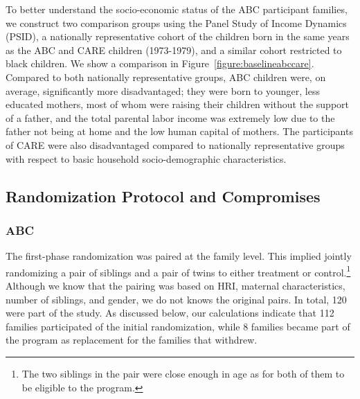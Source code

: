 \noindent To better understand the socio-economic status of the ABC participant families, we construct two comparison groups using the Panel Study of Income Dynamics (PSID), a nationally representative cohort of the children born in the same years as the ABC and CARE children (1973-1979), and a similar cohort restricted to black children. We show a comparison in Figure~\ref{figure:baselineabccare}. Compared to both nationally representative groups, ABC children were, on average, significantly more disadvantaged; they were born to younger, less educated mothers, most of whom were raising their children without the support of a father, and the total parental labor income was extremely low due to the father not being at home and the low human capital of mothers. The participants of CARE were also disadvantaged compared to nationally representative groups with respect to basic household socio-demographic characteristics.\\

\subsection{Randomization Protocol and Compromises}

\subsubsection{ABC}

\noindent The first-phase randomization was paired at the family level. This implied jointly randomizing a pair of siblings and a pair of twins to either treatment or control.\footnote{The two siblings in the pair were close enough in age as for both of them to be eligible to the program.} Although we know that the pairing was based on HRI, maternal characteristics, number of siblings, and gender, we do not knows the original pairs. In total, 120 were part of the study. As discussed below, our calculations indicate that 112 families participated of the initial randomization, while 8 families became part of the program as replacement for the families that withdrew.\\


